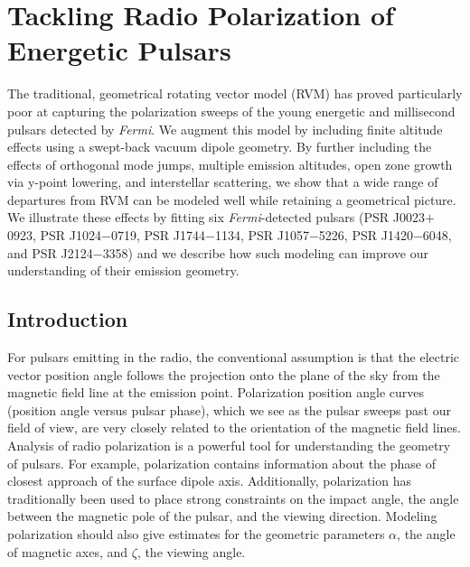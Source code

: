 \chapter[Energetic Pulsars]{Tackling Radio Polarization of Energetic Pulsars}
\label{chapter:tacklingPolarization}



The traditional, geometrical rotating vector model (RVM) has proved
particularly poor at capturing the polarization sweeps of the young energetic
and millisecond pulsars detected by \textit{Fermi}. We augment this model by including
finite altitude effects using a swept-back vacuum dipole geometry. By further
including the effects of orthogonal mode jumps, multiple emission altitudes, open
zone growth via y-point lowering, and interstellar scattering, we show that a wide
range of departures from RVM can be modeled well while retaining a geometrical
picture. We illustrate these effects by fitting six \textit{Fermi}-detected pulsars 
(PSR J0023$+$0923, PSR J1024$-$0719, PSR J1744$-$1134, PSR J1057$-$5226, PSR J1420$-$6048, and PSR J2124$-$3358) and 
we describe how such modeling can improve our understanding of their emission geometry.
\section{Introduction}
\label{sec:introTackling}


For pulsars emitting in the radio, the conventional assumption 
is that the electric vector position angle 
follows the projection onto the plane of the sky from 
the magnetic field line at the emission point.  
Polarization position angle curves (position angle versus pulsar phase), which we see
as the pulsar sweeps past our field of view,
are very closely related to the orientation of the magnetic field lines.
Analysis of radio polarization is a powerful tool for understanding the geometry of pulsars.
For example, polarization contains information about 
the phase of closest approach of the surface dipole axis.  
Additionally, polarization has traditionally been used to 
place strong constraints on the impact angle, the angle 
between the magnetic pole of the pulsar, and the viewing direction.
Modeling polarization should also give estimates for the geometric 
parameters $\alpha$, the angle of magnetic axes, and $\zeta$, the viewing angle.

